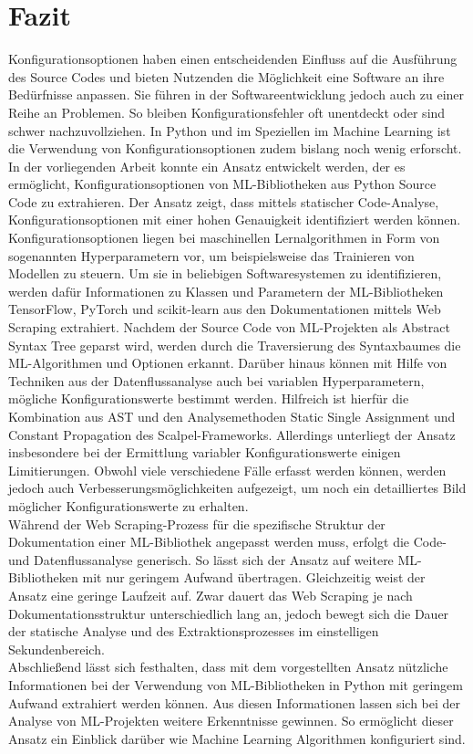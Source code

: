 \documentclass[german,bachelor]{swsLeipzig}
\begin{document}
\chapter{Fazit}\label{Fazit}
Konfigurationsoptionen haben einen entscheidenden Einfluss auf die Ausführung des Source Codes und bieten Nutzenden
die Möglichkeit eine Software an ihre Bedürfnisse anpassen.
Sie führen in der Softwareentwicklung jedoch auch zu einer Reihe an Problemen.
So bleiben Konfigurationsfehler oft unentdeckt oder sind schwer nachzuvollziehen.
In Python und im Speziellen im Machine Learning ist die Verwendung von Konfigurationsoptionen zudem bislang noch wenig erforscht.
In der vorliegenden Arbeit konnte ein Ansatz entwickelt werden, der es ermöglicht, Konfigurationsoptionen von ML-Bibliotheken
aus Python Source Code zu extrahieren.
Der Ansatz zeigt, dass mittels statischer Code-Analyse, Konfigurationsoptionen mit einer hohen Genauigkeit identifiziert werden
können.\\
\indent Konfigurationsoptionen liegen bei maschinellen Lernalgorithmen in Form von sogenannten Hyperparametern vor, um beispielsweise
das Trainieren von Modellen zu steuern.
Um sie in beliebigen Softwaresystemen zu identifizieren, werden dafür Informationen zu Klassen und Parametern der
ML-Bibliotheken TensorFlow, PyTorch und scikit-learn aus den Dokumentationen mittels Web Scraping extrahiert.
Nachdem der Source Code von ML-Projekten als Abstract Syntax Tree geparst wird, werden durch die Traversierung des Syntaxbaumes
die ML-Algorithmen und Optionen erkannt.
Darüber hinaus können mit Hilfe von Techniken aus der Datenflussanalyse auch bei variablen Hyperparametern,
mögliche Konfigurationswerte bestimmt werden.
Hilfreich ist hierfür die Kombination aus AST und den Analysemethoden Static Single Assignment und Constant Propagation
des Scalpel-Frameworks.
Allerdings unterliegt der Ansatz insbesondere bei der Ermittlung variabler Konfigurationswerte einigen Limitierungen.
Obwohl viele verschiedene Fälle erfasst werden können, werden jedoch auch Verbesserungsmöglichkeiten aufgezeigt, um noch ein
detailliertes Bild möglicher Konfigurationswerte zu erhalten.\\
\indent Während der Web Scraping-Prozess für die spezifische Struktur der Dokumentation einer ML-Bibliothek angepasst werden muss,
erfolgt die Code- und Datenflussanalyse generisch.
So lässt sich der Ansatz auf weitere ML-Bibliotheken mit nur geringem Aufwand übertragen.
Gleichzeitig weist der Ansatz eine geringe Laufzeit auf.
Zwar dauert das Web Scraping je nach Dokumentationsstruktur unterschiedlich lang an, jedoch bewegt sich die Dauer der statische Analyse
und des Extraktionsprozesses im einstelligen Sekundenbereich.\\
\indent Abschließend lässt sich festhalten, dass mit dem vorgestellten Ansatz nützliche Informationen bei der Verwendung
von ML-Bibliotheken in Python mit geringem Aufwand extrahiert werden können.
Aus diesen Informationen lassen sich bei der Analyse von ML-Projekten weitere Erkenntnisse gewinnen.
So ermöglicht dieser Ansatz ein Einblick darüber wie Machine Learning Algorithmen konfiguriert sind.
\end{document}
